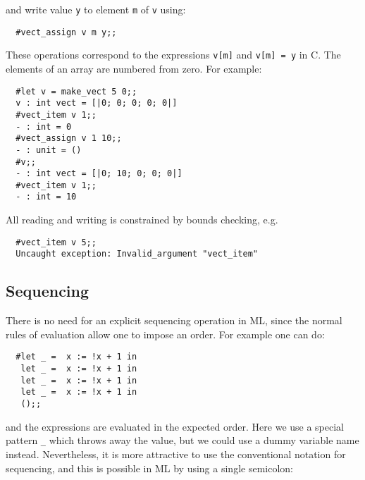 \noindent and write value {\tt y} to element {\tt m} of {\tt v} using:

\begin{boxed}\begin{verbatim}
  #vect_assign v m y;;
\end{verbatim}\end{boxed}

These operations correspond to the expressions {\tt v[m]} and {\tt v[m] = y} in
C. The elements of an array are numbered from zero. For example:

\begin{boxed}\begin{verbatim}
  #let v = make_vect 5 0;;
  v : int vect = [|0; 0; 0; 0; 0|]
  #vect_item v 1;;
  - : int = 0
  #vect_assign v 1 10;;
  - : unit = ()
  #v;;
  - : int vect = [|0; 10; 0; 0; 0|]
  #vect_item v 1;;
  - : int = 10
\end{verbatim}\end{boxed}

\noindent All reading and writing is constrained by bounds checking, e.g.

\begin{boxed}\begin{verbatim}
  #vect_item v 5;;
  Uncaught exception: Invalid_argument "vect_item"
\end{verbatim}\end{boxed}

\subsection{Sequencing}

There is no need for an explicit sequencing operation in ML, since the normal
rules of evaluation allow one to impose an order. For example one can do:

\begin{boxed}\begin{verbatim}
  #let _ =  x := !x + 1 in
   let _ =  x := !x + 1 in
   let _ =  x := !x + 1 in
   let _ =  x := !x + 1 in
   ();;
\end{verbatim}\end{boxed}

\noindent and the expressions are evaluated in the expected order. Here we use
a special pattern {\tt \_} which throws away the value, but we could use a
dummy variable name instead. Nevertheless, it is more attractive to use the
conventional notation for sequencing, and this is possible in ML by using a
single semicolon:

